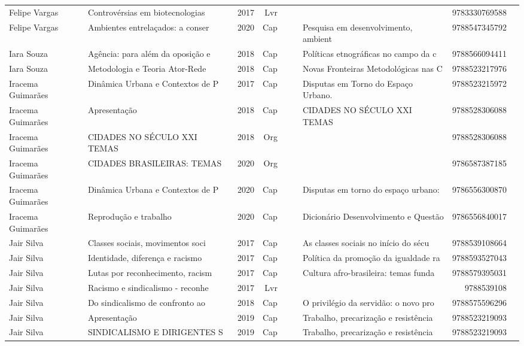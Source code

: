 \documentclass[12pt,brazil]{article}\usepackage[]{graphicx}\usepackage[]{xcolor}
\begin{document}
\begin{longtable}{lllrrllrr}
Felipe Vargas & Controvérsias em biotecnologias  & 2017 & Lvr &  &  &  & 9783330769588 \\
Felipe Vargas & Ambientes entrelaçados: a conser & 2020 & Cap &  &  & Pesquisa em desenvolvimento, ambient & 9788547345792 \\
\rowcolor{coautr}Iara Souza & Agência: para além da oposição e & 2018 & Cap &  &  & Políticas etnográficas no campo da c & 9788566094411 \\
Iara Souza & Metodologia e Teoria Ator-Rede & 2018 & Cap &  &  & Novas Fronteiras Metodológicas nas C & 9788523217976 \\
Iracema Guimarães & Dinâmica Urbana e Contextos de P & 2017 & Cap &  &  & Disputas em Torno do Espaço Urbano.  & 9788523215972 \\
Iracema Guimarães & Apresentação & 2018 & Cap &  &  & CIDADES NO SÉCULO XXI TEMAS & 9788528306088 \\
Iracema Guimarães & CIDADES NO SÉCULO XXI TEMAS & 2018 & Org &  &  &  & 9788528306088 \\
Iracema Guimarães & CIDADES BRASILEIRAS: TEMAS  & 2020 & Org &  &  &  & 9786587387185 \\
\rowcolor{duplic}Iracema Guimarães & Dinâmica Urbana e Contextos de P & 2020 & Cap &  &  & Disputas em torno do espaço urbano:  & 9786556300870 \\
Iracema Guimarães & Reprodução e trabalho & 2020 & Cap &  &  & Dicionário Desenvolvimento e Questão & 9786556840017 \\
Jair Silva & Classes sociais, movimentos soci & 2017 & Cap &  &  & As classes sociais no início do sécu & 9788539108664 \\
Jair Silva & Identidade, diferença e racismo & 2017 & Cap &  &  & Política da promoção da igualdade ra & 9788593527043 \\
Jair Silva & Lutas por reconhecimento, racism & 2017 & Cap &  &  & Cultura afro-brasileira: temas funda & 9788579395031 \\
Jair Silva & Racismo e sindicalismo - reconhe & 2017 & Lvr &  &  &  & 9788539108 \\
Jair Silva & Do sindicalismo de confronto ao  & 2018 & Cap &  &  & O privilégio da servidão: o novo pro & 9788575596296 \\
Jair Silva & Apresentação & 2019 & Cap &  &  & Trabalho, precarização e resistência & 9788523219093 \\
Jair Silva & SINDICALISMO E DIRIGENTES S & 2019 & Cap &  &  & Trabalho, precarização e resistência & 9788523219093 \\

\end{longtable}
\end{document}
